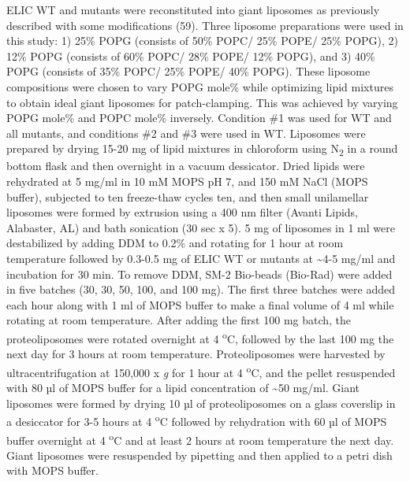 ELIC WT and mutants were reconstituted into giant liposomes as
previously described with some modifications (59). Three liposome
preparations were used in this study: 1) 25\% POPG (consists of 50\%
POPC/ 25\% POPE/ 25\% POPG), 2) 12\% POPG (consists of 60\% POPC/ 28\%
POPE/ 12\% POPG), and 3) 40\% POPG (consists of 35\% POPC/ 25\% POPE/
40\% POPG). These liposome compositions were chosen to vary POPG mole\%
while optimizing lipid mixtures to obtain ideal giant liposomes for
patch-clamping. This was achieved by varying POPG mole\% and POPC mole\%
inversely. Condition \#1 was used for WT and all mutants, and conditions
\#2 and \#3 were used in WT. Liposomes were prepared by drying 15-20 mg
of lipid mixtures in chloroform using N\textsubscript{2} in a round
bottom flask and then overnight in a vacuum dessicator. Dried lipids
were rehydrated at 5 mg/ml in 10 mM MOPS pH 7, and 150 mM NaCl (MOPS
buffer), subjected to ten freeze-thaw cycles ten, and then small
unilamellar liposomes were formed by extrusion using a 400 nm filter
(Avanti Lipids, Alabaster, AL) and bath sonication (30 sec x 5). 5 mg of
liposomes in 1 ml were destabilized by adding DDM to 0.2\% and rotating
for 1 hour at room temperature followed by 0.3-0.5 mg of ELIC WT or
mutants at \textasciitilde{}4-5 mg/ml and incubation for 30 min. To
remove DDM, SM-2 Bio-beads (Bio-Rad) were added in five batches (30, 30,
50, 100, and 100 mg). The first three batches were added each hour along
with 1 ml of MOPS buffer to make a final volume of 4 ml while rotating
at room temperature. After adding the first 100 mg batch, the
proteoliposomes were rotated overnight at 4 \textsuperscript{o}C,
followed by the last 100 mg the next day for 3 hours at room
temperature. Proteoliposomes were harvested by ultracentrifugation at
150,000 x \emph{g} for 1 hour at 4 \textsuperscript{o}C, and the pellet
resuspended with 80 µl of MOPS buffer for a lipid concentration of
\textasciitilde{}50 mg/ml. Giant liposomes were formed by drying 10 µl
of proteoliposomes on a glass coverslip in a desiccator for 3-5 hours at
4 \textsuperscript{o}C followed by rehydration with 60 µl of MOPS buffer
overnight at 4 \textsuperscript{o}C and at least 2 hours at room
temperature the next day. Giant liposomes were resuspended by pipetting
and then applied to a petri dish with MOPS buffer.

